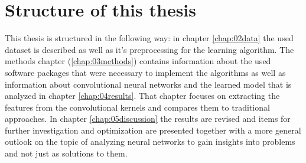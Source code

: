 \documentclass[main.tex]{subfiles}
\begin{document}
\section{Structure of this thesis}
This thesis is structured in the following way: in chapter \ref{chap:02data} the used dataset is described as well as it's preprocessing for the learning algorithm. The methods chapter (\ref{chap:03methods}) contains information about the used software packages that were necessary to implement the algorithms as well as information about convolutional neural networks and the learned model that is analyzed in chapter \ref{chap:04results}. That chapter focuses on extracting the features from the convolutional kernels and compares them to traditional approaches. In chapter \ref{chap:05discussion} the results are revised and items for further investigation and optimization are presented together with a more general outlook on the topic of analyzing neural networks to gain insights into problems and not just as solutions to them. 
\end{document}
